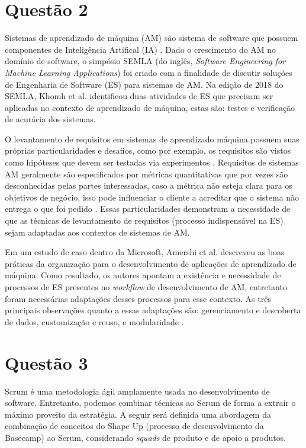 \documentclass[12pt]{article}
\begin{document}
\section{Questão 2}
Sistemas de aprendizado de máquina (AM) são sistema de software que possuem componentes de Inteligência Artifical (IA) \cite{khomh2018software}. Dado o crescimento do AM no domínio de software, o simpósio SEMLA (do inglês, \textit{Software Engineering for Machine Learning Applications}) foi criado com a finalidade de discutir soluções de Engenharia de Software (ES) para sistemas de AM. Na edição de 2018 do SEMLA, Khomh et al. identificou duas atividades de ES que precisam ser aplicadas no contexto de aprendizado de máquina, estas são: testes e verificação de acurácia dos sistemas.

O levantamento de requisitos em sistemas de aprendizado máquina possuem suas próprias particularidades e desafios, como por exemplo, os requisitos são vistos como hipóteses que devem ser testadas via experimentos \cite{wan2019does}. Requisitos de sistemas AM geralmente são especificados por métricas quantitativas que por vezes são desconhecidas pelas partes interessadas, caso a métrica não esteja clara para os objetivos de negócio, isso pode influenciar o cliente a acreditar que o sistema não entrega o que foi pedido  \cite{giray2021software}. Essas particularidades demonstram a necessidade de que as técnicas de levantamento de requisitos (processo indispensável na ES) sejam adaptadas aos contextos de sistemas de AM.

Em um estudo de caso dentro da Microsoft, Amershi et al. descreveu as boas práticas da organização para o desenvolvimento de aplicações de aprendizado de máquina. Como resultado, os autores apontam a existência e necessidade de processos de ES presentes no \textit{workflow} de desenvolvimento de AM, entretanto foram necessárias adaptações desses processos para esse contexto. As três principais observações quanto a essas adaptações são: gerenciamento e descoberta de dados, customização e reuso, e modularidade \cite{amershi2019software}.


\section{Questão 3}
Scrum é uma metodologia ágil amplamente usada no desenvolvimento de software. Entretanto, podemos combinar técnicas ao Scrum de forma a extrair o máximo proveito da estratégia. A seguir será definida uma abordagem da combinação de conceitos do Shape Up (processo de desenvolvimento da Basecamp) ao Scrum, considerando \textit{squads} de produto e de apoio a produtos.
\end{document}
